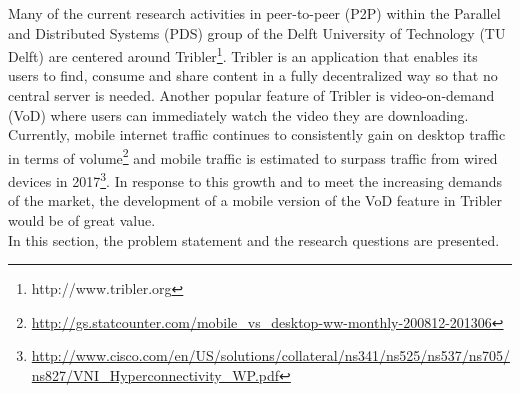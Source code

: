 Many of the current research activities in peer-to-peer (P2P) within the Parallel and Distributed Systems (PDS) group of the Delft University of Technology (TU Delft) are centered around Tribler\footnote{http://www.tribler.org}. Tribler is an application that enables its users to find, consume and share content in a fully decentralized way so that no central server is needed. Another popular feature of Tribler is video-on-demand (VoD) where users can immediately watch the video they are downloading. Currently, mobile internet traffic continues to consistently gain on desktop traffic in terms of volume\footnote{\url{http://gs.statcounter.com/mobile\_vs\_desktop-ww-monthly-200812-201306}} and mobile traffic is estimated to surpass traffic from wired devices in 2017\footnote{\url{http://www.cisco.com/en/US/solutions/collateral/ns341/ns525/ns537/ns705/ns827/VNI\_Hyperconnectivity\_WP.pdf}}. In response to this growth and to meet the increasing demands of the market, the development of a mobile version of the VoD feature in Tribler would be of great value.\\
In this section, the problem statement and the research questions are presented.